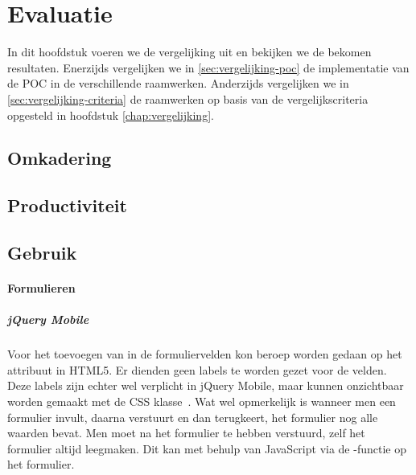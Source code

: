 \chapter{Evaluatie}
\label{chap:evaluatie}

In dit hoofdstuk voeren we de vergelijking uit en bekijken we de bekomen resultaten.
Enerzijds vergelijken we in \ref{sec:vergelijking-poc} de implementatie van de POC in de verschillende raamwerken.
Anderzijds vergelijken we in \ref{sec:vergelijking-criteria} de raamwerken op basis van de vergelijkscriteria opgesteld in hoofdstuk \ref{chap:vergelijking}.


\section{Omkadering}



\section{Productiviteit}

\section{Gebruik}

\subsubsection{Formulieren}

\paragraph{jQuery Mobile} 
Voor het toevoegen van  in de formuliervelden kon beroep worden gedaan op het  attribuut in HTML5. 
Er dienden geen labels te worden gezet voor de velden. 
Deze labels zijn echter wel verplicht in jQuery Mobile, maar kunnen onzichtbaar worden gemaakt met de  CSS klasse~\cite{JQuery2013}. 
Wat wel opmerkelijk is wanneer men een formulier invult, daarna verstuurt en dan terugkeert, het formulier nog alle waarden bevat. 
Men moet na het formulier te hebben verstuurd, zelf het formulier altijd leegmaken. 
Dit kan met behulp van JavaScript via de -functie op het formulier.

